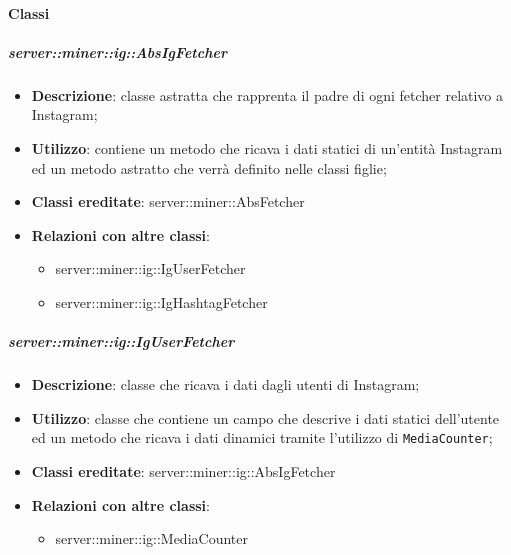 	\paragraph{Classi} %
	\subparagraph{server::miner::ig::AbsIgFetcher} %
		\label{subp:server_miner_ig_AbsIgFetcher}
			\begin{itemize}
				\item \textbf{Descrizione}: classe astratta che rapprenta il padre di ogni fetcher relativo a Instagram;
				\item \textbf{Utilizzo}: contiene un metodo che ricava i dati statici di un'entità Instagram ed un metodo astratto che verrà definito nelle classi figlie;
				\item \textbf{Classi ereditate}: server::miner::AbsFetcher
				\item \textbf{Relazioni con altre classi}:
					\begin{itemize}
						\item server::miner::ig::IgUserFetcher
						\item server::miner::ig::IgHashtagFetcher
					\end{itemize}
			\end{itemize}

	\subparagraph{server::miner::ig::IgUserFetcher} %
		\label{subp:server_miner_ig_IgUserFetcher}
			\begin{itemize}
				\item \textbf{Descrizione}: classe che ricava i dati dagli utenti di Instagram;
				\item \textbf{Utilizzo}: classe che contiene un campo che descrive i dati statici dell'utente ed un metodo che ricava i dati dinamici tramite l'utilizzo di \texttt{MediaCounter};
				\item \textbf{Classi ereditate}: server::miner::ig::AbsIgFetcher
				\item \textbf{Relazioni con altre classi}:
					\begin{itemize}
						\item server::miner::ig::MediaCounter
					\end{itemize}
			\end{itemize}

